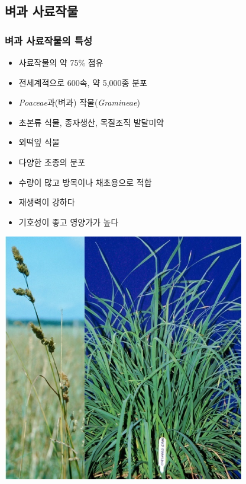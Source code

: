 \documentclass[]{book}
\providecommand{\tightlist}{%
  \setlength{\itemsep}{0pt}\setlength{\parskip}{0pt}}
\begin{document}
\subsection{벼과 사료작물}\label{-}

\subsubsection{벼과 사료작물의 특성}\label{--}

\begin{itemize}
\tightlist
\item
  사료작물의 약 75\% 점유
\item
  전세계적으로 600속, 약 5,000종 분포
\item
  \emph{Poaceae}과(벼과) 작물(\emph{Gramineae})
\item
  초본류 식물, 종자생산, 목질조직 발달미약
\item
  외떡잎 식물
\item
  다양한 초종의 분포
\item
  수량이 많고 방목이나 채초용으로 적합
\item
  재생력이 강하다
\item
  기호성이 좋고 영양가가 높다
\end{itemize}

\includegraphics[width=400]{figures/grass1}
\end{document}
